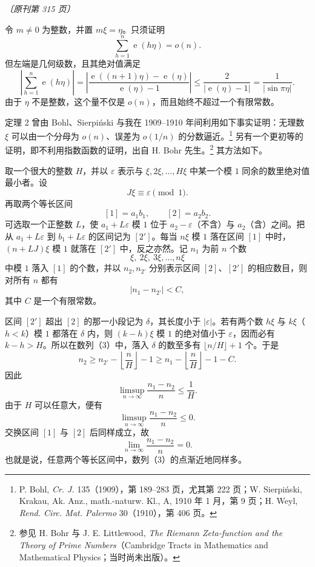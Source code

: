 \documentclass[UTF8,11pt,a4paper,fontset=none]{ctexart}
\theoremstyle{weylthm}
\newcommand{\e}{\operatorname{e}}
\newcommand{\origpage}[1]{%
  \par\vspace{0.7em}\noindent\hfill{\small\itshape〔原刊第 #1 页〕}\par\vspace{0.25em}}
\begin{document}
\origpage{315}

令 \(m\neq0\) 为整数，并置 \(m\xi=\eta\)。只须证明
\[
  \sum_{h=1}^{n}\e(h\eta)=o(n).
\]
但左端是几何级数，且其绝对值满足
\[
  \left|\sum_{h=1}^{n}\e(h\eta)\right|
  =\left|\frac{\e((n+1)\eta)-\e(\eta)}{\e(\eta)-1}\right|
  \leq\frac{2}{|\e(\eta)-1|}
  =\frac{1}{|\sin\pi\eta|}.
\]
由于 \(\eta\) 不是整数，这个量不仅是 \(o(n)\)，而且始终不超过一个有限常数。

定理 2 曾由 Bohl、Sierpiński 与我在 1909--1910 年间利用如下事实证明：无理数 \(\xi\) 可以由一个分母为 \(o(n)\)、误差为 \(o(1/n)\) 的分数逼近。\footnote{P. Bohl, \textit{Cr. J.} 135（1909），第 189--283 页，尤其第 222 页；W. Sierpiński, Krakau, Ak. Anz., math.-naturw. Kl., A, 1910 年 1 月，第 9 页；H. Weyl, \textit{Rend. Circ. Mat. Palermo} 30（1910），第 406 页。} 另有一个更初等的证明，即不利用指数函数的证明，出自 H. Bohr 先生。\footnote{参见 H. Bohr 与 J. E. Littlewood, \textit{The Riemann Zeta-function and the Theory of Prime Numbers}（Cambridge Tracts in Mathematics and Mathematical Physics；当时尚未出版）。} 其方法如下。

取一个很大的整数 \(H\)，并以 \(\varepsilon\) 表示与
\(\xi,2\xi,\ldots,H\xi\) 中某一个模 \(1\) 同余的数里绝对值最小者。设
\[
  J\xi\equiv\varepsilon\pmod1.
\]
再取两个等长区间
\[
  [1]=a_1b_1,
  \qquad
  [2]=a_2b_2.
\]
可选取一个正整数 \(L\)，使 \(a_1+L\varepsilon\) 模 \(1\) 位于
\(a_2-\varepsilon\)（不含）与 \(a_2\)（含）之间。把从
\(a_1+L\varepsilon\) 到 \(b_1+L\varepsilon\) 的区间记为 \([2']\)。每当
\(n\xi\) 模 \(1\) 落在区间 \([1]\) 中时，
\((n+LJ)\xi\) 模 \(1\) 就落在 \([2']\) 中，反之亦然。记 \(n_1\) 为前 \(n\) 个数
\begin{equation}
  \xi,\ 2\xi,\ 3\xi,\ldots,n\xi
  \tag{3}
\end{equation}
中模 \(1\) 落入 \([1]\) 的个数，并以 \(n_2,n_{2'}\) 分别表示区间 \([2]\)、\([2']\) 的相应数目，则对所有 \(n\) 都有
\[
  |n_1-n_{2'}|<C,
\]
其中 \(C\) 是一个有限常数。

区间 \([2']\) 超出 \([2]\) 的那一小段记为 \(\delta\)，其长度小于 \(|\varepsilon|\)。若有两个数 \(h\xi\) 与 \(k\xi\)（\(h<k\)）模 \(1\) 都落在 \(\delta\) 内，则
\((k-h)\xi\) 模 \(1\) 的绝对值小于 \(\varepsilon\)，因而必有 \(k-h>H\)。所以在数列（3）中，落入 \(\delta\) 的数至多有
\(\lfloor n/H\rfloor+1\) 个。于是
\[
  n_2\geq n_{2'}-\left\lfloor\frac nH\right\rfloor-1
  \geq n_1-\left\lfloor\frac nH\right\rfloor-1-C.
\]
因此
\[
  \limsup_{n\to\infty}\frac{n_1-n_2}{n}\leq\frac1H.
\]
由于 \(H\) 可以任意大，便有
\[
  \limsup_{n\to\infty}\frac{n_1-n_2}{n}\leq0.
\]
交换区间 \([1]\) 与 \([2]\) 后同样成立，故
\[
  \lim_{n\to\infty}\frac{n_1-n_2}{n}=0.
\]
也就是说，任意两个等长区间中，数列（3）的点渐近地同样多。
\end{document}
